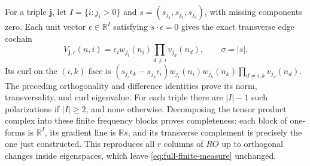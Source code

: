 For a triple $\boldsymbol j$, let $I=\{i:j_i>0\}$ and
$s=(s_{j_1},s_{j_2},s_{j_3})$, with missing components zero. Each unit
vector $\epsilon\in\mathbb R^I$ satisfying $s\cdot\epsilon=0$
gives the exact transverse edge cochain
\begin{equation}\label{eq:full-mode-cochain}
 V_{\boldsymbol j,\epsilon}(n,i)
   =\epsilon_i w_{j_i}(n_i)\prod_{d\ne i}v_{j_d}(n_d),
 \qquad \sigma=|s|.
\end{equation}
Its curl on the $(i,k)$ face is
$(s_{j_i}\epsilon_k-s_{j_k}\epsilon_i)
w_{j_i}(n_i)w_{j_k}(n_k)\prod_{d\ne i,k}v_{j_d}(n_d)$.
The preceding orthogonality and difference identities prove its norm,
transversality, and curl eigenvalue. For each triple there are $|I|-1$
such polarizations if $|I|\ge2$, and none otherwise. Decomposing the
tensor product complex into these finite frequency blocks proves
completeness: each block of one-forms is $\mathbb R^I$, its gradient
line is $\mathbb Rs$, and its transverse complement is precisely the
one just constructed. This reproduces all $r$ columns of $RO$ up to
orthogonal changes inside eigenspaces, which leave
\eqref{eq:full-finite-measure} unchanged.

